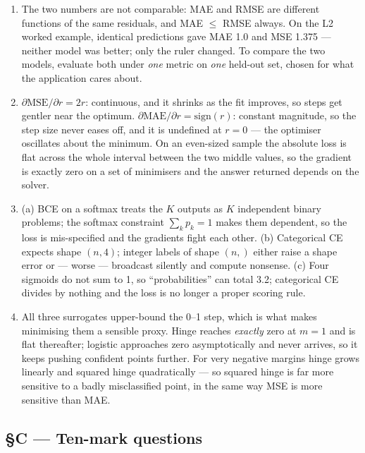 \documentclass[11pt,a4paper]{article}
\newcommand{\A}[1]{\item[\textbf{#1}]}
\begin{document}
\begin{enumerate}[leftmargin=1.9cm]
\A{U2.26} The two numbers are not comparable: MAE and RMSE are different
functions of the same residuals, and MAE $\le$ RMSE always. On the L2 worked
example, identical predictions gave MAE 1.0 and MSE 1.375 --- neither model was
better; only the ruler changed. To compare the two models, evaluate both under
\emph{one} metric on \emph{one} held-out set, chosen for what the application
cares about.

\A{U2.27} $\partial\text{MSE}/\partial r = 2r$: continuous, and it shrinks as
the fit improves, so steps get gentler near the optimum.
$\partial\text{MAE}/\partial r = \text{sign}(r)$: constant magnitude, so the
step size never eases off, and it is undefined at $r = 0$ --- the optimiser
oscillates about the minimum. On an even-sized sample the absolute loss is flat
across the whole interval between the two middle values, so the gradient is
exactly zero on a set of minimisers and the answer returned depends on the
solver.

\A{U2.28} (a) BCE on a softmax treats the $K$ outputs as $K$ independent binary
problems; the softmax constraint $\sum_k p_k = 1$ makes them dependent, so the
loss is mis-specified and the gradients fight each other. (b) Categorical CE
expects shape $(n,4)$; integer labels of shape $(n,)$ either raise a shape
error or --- worse --- broadcast silently and compute nonsense. (c) Four
sigmoids do not sum to 1, so ``probabilities'' can total 3.2; categorical CE
divides by nothing and the loss is no longer a proper scoring rule.

\A{U2.29} All three surrogates upper-bound the 0--1 step, which is what makes
minimising them a sensible proxy. Hinge reaches \emph{exactly} zero at $m = 1$
and is flat thereafter; logistic approaches zero asymptotically and never
arrives, so it keeps pushing confident points further. For very negative
margins hinge grows linearly and squared hinge quadratically --- so squared
hinge is far more sensitive to a badly misclassified point, in the same way MSE
is more sensitive than MAE.

\end{enumerate}

\subsection*{§C --- Ten-mark questions}
\end{document}
